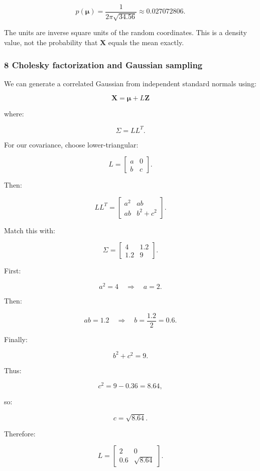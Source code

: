 \[
 \boxed{ p(\boldsymbol\mu) = \frac1{2\pi\sqrt{34.56}} \approx0.027072806 }.
\]

The units are inverse square units of the random coordinates. This is a density value, not the probability that \(\mathbf X\) equals the mean exactly.

\subsubsection{8 Cholesky factorization and Gaussian sampling}\label{02-foundations-ii-ch024-cholesky-factorization-and-gaussian-sampling}

We can generate a correlated Gaussian from independent standard normals using:

\[
 \mathbf X=\boldsymbol\mu+L\mathbf Z
\]

where:

\[
 \Sigma=LL^T.
\]

For our covariance, choose lower-triangular:

\[
 L= \begin{bmatrix} a&0\\ b&c \end{bmatrix}.
\]

Then:

\[
 LL^T= \begin{bmatrix} a^2&ab\\ ab&b^2+c^2 \end{bmatrix}.
\]

Match this with:

\[
 \Sigma= \begin{bmatrix} 4&1.2\\ 1.2&9 \end{bmatrix}.
\]

First:

\[
 a^2=4 \quad\Longrightarrow\quad a=2.
\]

Then:

\[
 ab=1.2 \quad\Longrightarrow\quad b=\frac{1.2}{2}=0.6.
\]

Finally:

\[
 b^2+c^2=9.
\]

Thus:

\[
 c^2=9-0.36=8.64,
\]

so:

\[
 c=\sqrt{8.64}.
\]

Therefore:

\[
 \boxed{ L= \begin{bmatrix} 2&0\\ 0.6&\sqrt{8.64} \end{bmatrix} }.
\]

